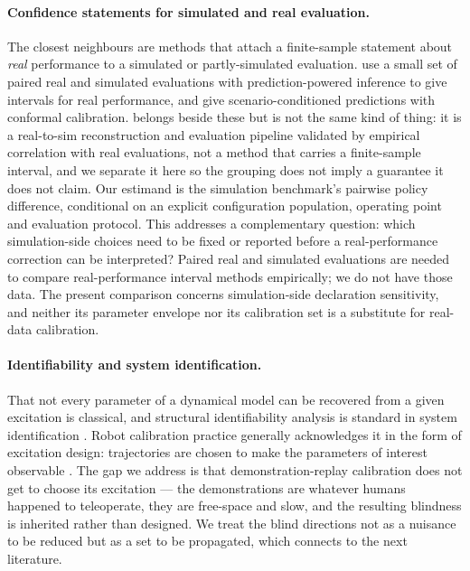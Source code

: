 \documentclass[pdflatex,iicol,sn-apa]{sn-jnl}
\theoremstyle{remark}
\begin{document}
\paragraph{Confidence statements for simulated and real evaluation.}
The closest neighbours are methods that attach a finite-sample statement about \emph{real}
performance to a simulated or partly-simulated evaluation. \citet{suresim2025} use a small set of
paired real and simulated evaluations with prediction-powered inference to give intervals for real
performance, and \citet{scape2026} give scenario-conditioned predictions with conformal
calibration. \citet{polaris2025} belongs beside these but is not the same kind of thing: it is a
real-to-sim reconstruction and evaluation pipeline validated by empirical correlation with real
evaluations, not a method that carries a finite-sample interval, and we separate it here so the
grouping does not imply a guarantee it does not claim. Our estimand is the simulation benchmark's
pairwise policy difference, conditional on an explicit configuration population, operating point
and evaluation protocol. This addresses a complementary question: which simulation-side choices
need to be fixed or reported before a real-performance correction can be interpreted? Paired real
and simulated evaluations are needed to compare real-performance interval methods empirically;
we do not have those data. The present comparison concerns simulation-side declaration sensitivity,
and neither its parameter envelope nor its calibration set is a substitute for real-data calibration.

\paragraph{Identifiability and system identification.}
That not every parameter of a dynamical model can be recovered from a given excitation is classical,
and structural identifiability analysis is standard in system identification \citep{ljung1999system,
bellman1970structural}. Robot calibration practice generally acknowledges it in the form of
excitation design: trajectories are chosen to make the parameters of interest observable
\citep{swevers1997optimal}. The gap we address is that demonstration-replay calibration does not get
to choose its excitation --- the demonstrations are whatever humans happened to teleoperate, they
are free-space and slow, and the resulting blindness is inherited rather than designed. We treat the
blind directions not as a nuisance to be reduced but as a set to be propagated, which connects to
the next literature.
\end{document}

